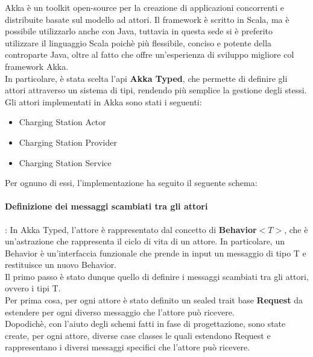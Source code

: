 Akka è un toolkit open-source per la creazione di applicazioni concorrenti e distribuite
basate sul modello ad attori. Il framework è scritto in Scala, ma è possibile utilizzarlo
anche con Java, tuttavia in questa sede si è preferito utilizzare il linguaggio Scala poichè
più flessibile, conciso e potente della controparte Java, oltre al fatto che offre un'esperienza
di sviluppo migliore col framework Akka.\\

In particolare, è stata scelta l'api \textbf{Akka Typed}, che permette di definire
gli attori attraverso un sistema di tipi, rendendo più semplice la gestione degli stessi.\\

Gli attori implementati in Akka sono stati i seguenti:
\begin{itemize}
      \item Charging Station Actor
      \item Charging Station Provider
      \item Charging Station Service
\end{itemize}

Per ognuno di essi, l'implementazione ha seguito il seguente schema:\\

\paragraph{Definizione dei messaggi scambiati tra gli attori}:
In Akka Typed, l'attore è rappresentato dal concetto di \textbf{Behavior$<T>$}, che è
un'astrazione che rappresenta il ciclo di vita di un attore. In particolare, un Behavior
è un'interfaccia funzionale che prende in input un messaggio di tipo T e restituisce un nuovo Behavior.\\

Il primo passo è stato dunque quello di definire i messaggi scambiati tra gli attori, ovvero i tipi T.\\

Per prima cosa, per ogni attore è stato definito un sealed trait base \textbf{Request} da estendere
per ogni diverso messaggio che l'attore può ricevere.\\

Dopodichè, con l'aiuto degli schemi fatti in fase di progettazione, sono state create,
per ogni attore, diverse case classes le quali estendono Request e rappresentano i diversi
messaggi specifici che l'attore può ricevere.\\

